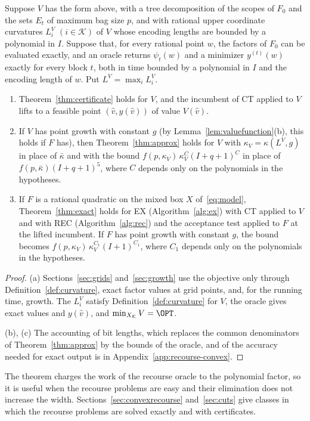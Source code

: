 \begin{theorem}\label{thm:valuefn}
Suppose $V$ has the form above, with a tree decomposition of the scopes of
$F_0$ and the sets $E_t$ of maximum bag size $p$, and with rational upper
coordinate curvatures $L_i^V$ $(i\in\mathcal K)$ of $V$ whose encoding
lengths are bounded by a polynomial in $I$. Suppose that, for every rational
point $w$, the factors of $F_0$ can be evaluated exactly, and an oracle
returns $\psi_t(w)$ and a minimizer $y^{(t)}(w)$ exactly for every block $t$,
both in time bounded by a polynomial in $I$ and the encoding length of $w$.
Put $L^V=\max_iL_i^V$.
\begin{enumerate}[label=(\alph*)]
\item Theorem~\ref{thm:certificate} holds for $V$, and the incumbent of CT
applied to $V$ lifts to a feasible point $(\hat v,y(\hat v))$ of value
$V(\hat v)$.
\item If $V$ has point growth with constant $g$ (by
Lemma~\ref{lem:valuefunction}(b), this holds if $F$ has), then
Theorem~\ref{thm:approx} holds for $V$ with $\kappa_V=\kappa(L^V,g)$ in
place of $\bar\kappa$ and with the bound
$f(p,\kappa_V)\,\kappa_V^{C}(I+q+1)^{C}$ in place of
$f(p,\bar\kappa)(I+q+1)^5$, where $C$ depends only on the polynomials in
the hypotheses.
\item If $F$ is a rational quadratic on the mixed box $X$
of~\eqref{eq:model}, Theorem~\ref{thm:exact} holds for EX
(Algorithm~\ref{alg:ex}) with CT applied to $V$ and with REC
(Algorithm~\ref{alg:rec}) and the acceptance test applied to $F$ at the
lifted incumbent. If $F$ has point
growth with constant $g$, the bound becomes
$f(p,\kappa_V)\,\kappa_V^{C_1}(I+1)^{C_1}$, where $C_1$ depends only on the
polynomials in the hypotheses.
\end{enumerate}
\end{theorem}

\begin{proof}
(a) Sections~\ref{sec:grids} and~\ref{sec:growth} use the objective only
through Definition~\ref{def:curvature}, exact factor values at grid points,
and, for the running time, growth. The $L_i^V$ satisfy
Definition~\ref{def:curvature} for $V$, the oracle gives exact values and
$y(\hat v)$, and $\min_{X_{\mathcal K}}V=\OPT$.

(b), (c) The accounting of bit lengths, which replaces the common
denominators of Theorem~\ref{thm:approx} by the bounds of the oracle, and of
the accuracy needed for exact output is in
Appendix~\ref{app:recourse-convex}.
\end{proof}

The theorem charges the work of the recourse oracle to the polynomial
factor, so it is useful when the recourse problems are easy and their
elimination does not increase the width. Sections~\ref{sec:convexrecourse}
and~\ref{sec:cuts} give classes in which the recourse problems are solved
exactly and with certificates.
